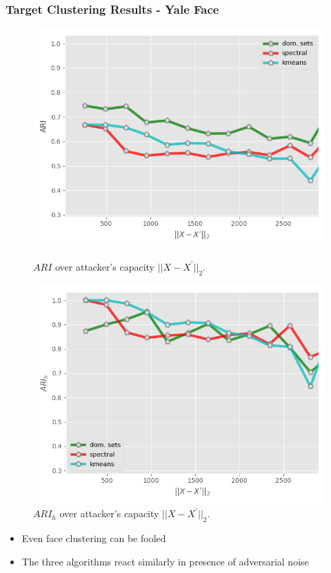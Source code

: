 \documentclass{beamer}
\begin{document}
\begin{frame}
	\frametitle{Target Clustering Results - Yale Face}
	\begin{figure}[H]
		\begin{minipage}[t]{0.45\linewidth}
			\centering
			\includegraphics[width=1\textwidth]{img/target/yaleARI.png}
			\caption{\footnotesize $ARI$ over attacker's capacity  $\vert \vert X - X^\prime\vert \vert_2$.}
		\end{minipage}        
		\hspace{.1cm}
		\begin{minipage}[t]{0.45\linewidth}
			\centering
			\includegraphics[width=1\textwidth]{img/target/yaleARIh.png}
			\caption{\footnotesize $ARI_h$ over attacker's capacity $\vert \vert X - X^\prime\vert \vert_2$.}
		\end{minipage}
	\end{figure}
	\changefontsizes{8pt}
	\begin{itemize}
		\item Even face clustering can be fooled
		\item The three algorithms react similarly in presence of adversarial noise
	\end{itemize}
\end{frame}
\end{document}
